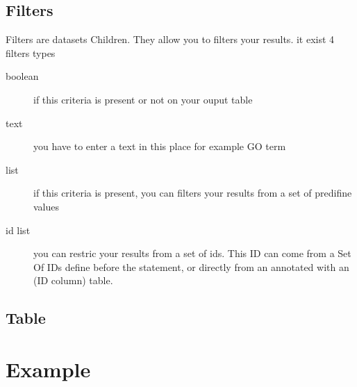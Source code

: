 \subsection{Filters}
Filters are datasets Children. They allow you to filters your results. it exist 4 filters types
\begin{description}
\item[boolean] if this criteria is present or not on your ouput table
\item[text] you have to enter a text in this place for example GO term
\item[list] if this criteria is present, you can filters your results from a set of predifine values
\item[id list] you can restric your results from a set of ids. This ID can come from a Set Of IDs define before the statement, or directly from an annotated with an (ID column) table.  
\end{description}
\subsection{Table}

\section{Example}
